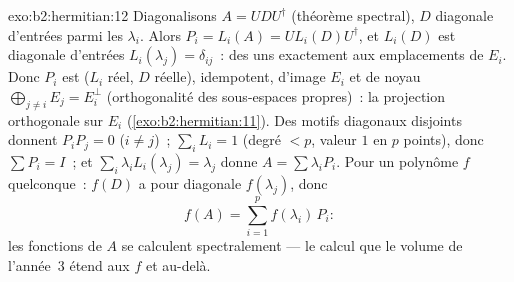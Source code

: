 \begin{solution}{exo:b2:hermitian:12}
Diagonalisons $A = U D U^\dagger$ (théorème spectral), $D$ diagonale
d'entrées parmi les $\lambda_i$. Alors $P_i = L_i(A) = U
L_i(D)U^\dagger$, et $L_i(D)$ est diagonale d'entrées
$L_i(\lambda_j) = \delta_{ij}$~: des uns exactement aux emplacements de
$E_i$. Donc $P_i$ est  ($L_i$ réel, $D$ réelle), idempotent,
d'image $E_i$ et de noyau $\bigoplus_{j\neq i}E_j = E_i^\perp$
(orthogonalité des sous-espaces propres)~: la projection orthogonale sur
$E_i$ (\cref{exo:b2:hermitian:11}). Des motifs diagonaux disjoints
donnent $P_iP_j = 0$ ($i \neq j$)~; $\sum_i L_i = 1$ (degré $< p$,
valeur $1$ en $p$ points), donc $\sum P_i = I$~; et $\sum_i
\lambda_iL_i(\lambda_j) = \lambda_j$ donne $A = \sum
\lambda_iP_i$. Pour un polynôme $f$ quelconque~: $f(D)$ a pour diagonale
$f(\lambda_j)$, donc
\[
f(A) = \sum_{i=1}^{p} f(\lambda_i)\,P_i :
\]
les fonctions de $A$ se calculent spectralement --- le calcul que
le volume de l'année~3 étend aux $f$  et au-delà.
\end{solution}

